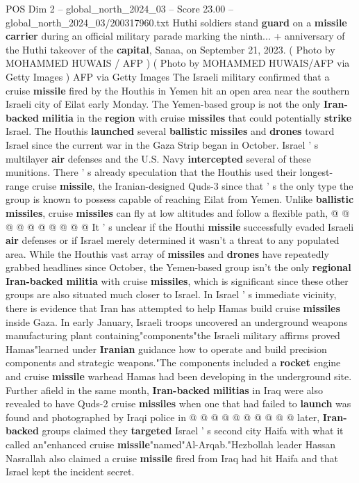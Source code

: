 \begin{textsample}{POS Dim 2 – global\_north\_2024\_03 – Score 23.00 – global\_north\_2024\_03/200317960.txt}  \label{ex:f2_pos_361}
Huthi soldiers stand \textbf{guard} on a \textbf{missile} \textbf{carrier} during an official military parade marking the ninth... + anniversary of the Huthi takeover of the \textbf{capital}, Sanaa, on September 21, 2023. ( Photo by MOHAMMED HUWAIS / AFP ) ( Photo by MOHAMMED HUWAIS/AFP via Getty Images ) AFP via Getty Images The Israeli military confirmed that a cruise \textbf{missile} fired by the Houthis in Yemen hit an open area near the southern Israeli city of Eilat early Monday.
The Yemen-based group is not the only \textbf{Iran-backed} \textbf{militia} in the \textbf{region} with cruise \textbf{missiles} that could potentially \textbf{strike} Israel.
The Houthis \textbf{launched} several \textbf{ballistic} \textbf{missiles} and \textbf{drones} toward Israel since the current war in the Gaza Strip began in October.
Israel ' s multilayer \textbf{air} defenses and the U.S.
Navy \textbf{intercepted} several of these munitions.
There ' s already speculation that the Houthis used their longest-range cruise \textbf{missile}, the Iranian-designed Quds-3 since that ' s the only type the group is known to possess capable of reaching Eilat from Yemen.
Unlike \textbf{ballistic} \textbf{missiles}, cruise \textbf{missiles} can fly at low altitudes and follow a flexible path, @ @ @ @ @ @ @ @ @ @ It ' s unclear if the Houthi \textbf{missile} successfully evaded Israeli \textbf{air} defenses or if Israel merely determined it wasn't a threat to any populated area.
While the Houthis vast array of \textbf{missiles} and \textbf{drones} have repeatedly grabbed headlines since October, the Yemen-based group isn't the only \textbf{regional} \textbf{Iran-backed} \textbf{militia} with cruise \textbf{missiles}, which is significant since these other groups are also situated much closer to Israel.
In Israel ' s immediate vicinity, there is evidence that Iran has attempted to help Hamas build cruise \textbf{missiles} inside Gaza.
In early January, Israeli troops uncovered an underground weapons manufacturing plant containing"components"the Israeli military affirms proved Hamas"learned under \textbf{Iranian} guidance how to operate and build precision components and strategic weapons."The components included a \textbf{rocket} engine and cruise \textbf{missile} warhead Hamas had been developing in the underground site.
Further afield in the same month, \textbf{Iran-backed} \textbf{militias} in Iraq were also revealed to have Quds-2 cruise \textbf{missiles} when one that had failed to \textbf{launch} was found and photographed by Iraqi police in @ @ @ @ @ @ @ @ @ @ later, \textbf{Iran-backed} groups claimed they \textbf{targeted} Israel ' s second city Haifa with what it called an"enhanced cruise \textbf{missile}"named"Al-Arqab."Hezbollah leader Hassan Nasrallah also claimed a cruise \textbf{missile} fired from Iraq had hit Haifa and that Israel kept the incident secret.

\end{textsample}

